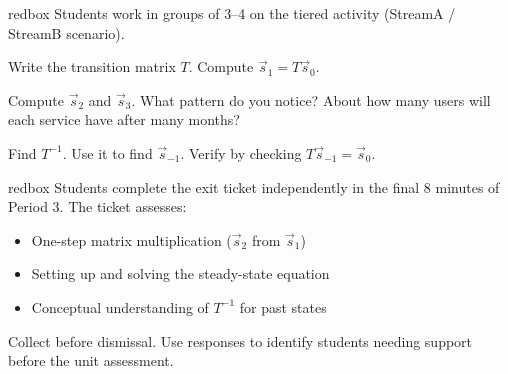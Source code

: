 \documentclass[10pt]{article}
\begin{document}
\begin{skillbox}{redbox}
Students work in groups of 3--4 on the tiered activity (StreamA / StreamB scenario).

\begin{tcolorbox}[colback=white, colframe=black!40, title=\textbf{Tier R --- Remediate}, fonttitle=\bfseries, arc=2mm, left=3mm, right=3mm, top=2mm, bottom=2mm]
Write the transition matrix $T$. Compute $\vec{s}_1 = T\vec{s}_0$.
\end{tcolorbox}

\begin{tcolorbox}[colback=goldbg, colframe=goldacc, title=\textbf{Tier A --- Apply}, fonttitle=\bfseries, arc=2mm, left=3mm, right=3mm, top=2mm, bottom=2mm]
Compute $\vec{s}_2$ and $\vec{s}_3$. What pattern do you notice? About how many users will each service have after many months?
\end{tcolorbox}

\begin{tcolorbox}[colback=greenbg, colframe=greenacc, title=\textbf{Tier E --- Extend}, fonttitle=\bfseries, arc=2mm, left=3mm, right=3mm, top=2mm, bottom=2mm]
Find $T^{-1}$. Use it to find $\vec{s}_{-1}$. Verify by checking $T\vec{s}_{-1} = \vec{s}_0$.
\end{tcolorbox}
\end{skillbox}

\begin{skillbox}{redbox}
Students complete the exit ticket independently in the final 8 minutes of Period 3. The ticket assesses:
\begin{itemize}[leftmargin=1.4em, itemsep=1pt]
  \item One-step matrix multiplication ($\vec{s}_2$ from $\vec{s}_1$)
  \item Setting up and solving the steady-state equation
  \item Conceptual understanding of $T^{-1}$ for past states
\end{itemize}
Collect before dismissal. Use responses to identify students needing support before the unit assessment.
\end{skillbox}
\end{document}

